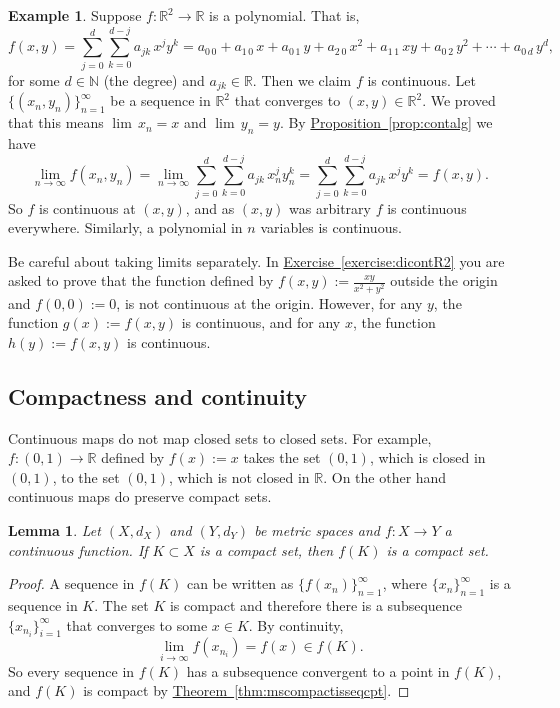 \documentclass[12pt]{book}
\newcommand{\R}{{\mathbb{R}}}
\newcommand{\N}{{\mathbb{N}}}
\theoremstyle{plain}
\newtheorem{lemma}[thm]{Lemma}
\theoremstyle{remark}
\theoremstyle{definition}
\theoremstyle{exercise}
\theoremstyle{example}
\newtheorem{example}[thm]{Example}
\newcommand{\exerciseref}[1]{\hyperref[#1]{Exercise~\ref*{#1}}}
\newcommand{\thmref}[1]{\hyperref[#1]{Theorem~\ref*{#1}}}
\newcommand{\propref}[1]{\hyperref[#1]{Proposition~\ref*{#1}}}
\begin{document}
\begin{example}
Suppose $f \colon \R^2 \to \R$ is a polynomial.  That is,
\begin{equation*}
f(x,y) =
\sum_{j=0}^d
\sum_{k=0}^{d-j}
a_{jk}\,x^jy^k =
a_{0\,0} + a_{1\,0} \, x +
a_{0\,1} \, y+  
a_{2\,0} \, x^2+  
a_{1\,1} \, xy+  
a_{0\,2} \, y^2+ \cdots +
a_{0\,d} \, y^d ,
\end{equation*}
for some $d \in \N$ (the degree) and $a_{jk} \in \R$.  Then we claim 
$f$ is continuous.  Let $\{ (x_n,y_n) \}_{n=1}^\infty$ be a sequence
in $\R^2$ that converges to $(x,y) \in \R^2$.  We proved that this
means $\lim\, x_n = x$ and $\lim\, y_n = y$.
By \propref{prop:contalg} we have
\begin{equation*}
\lim_{n\to\infty}
f(x_n,y_n) =
\lim_{n\to\infty}
\sum_{j=0}^d
\sum_{k=0}^{d-j}
a_{jk} \, x_n^jy_n^k 
=
\sum_{j=0}^d
\sum_{k=0}^{d-j}
a_{jk} \, x^jy^k
=
f(x,y) .
\end{equation*}
So $f$ is continuous at $(x,y)$, and as $(x,y)$ was arbitrary $f$ is
continuous everywhere.  Similarly, a
polynomial in $n$ variables is continuous.
\end{example}

Be careful about taking limits separately.  In \exerciseref{exercise:dicontR2}
you are asked to prove that the function defined by $f(x,y) := \frac{xy}{x^2+y^2}$
outside the origin and $f(0,0) := 0$, is not continuous at the origin.
However, for any $y$, the function $g(x) := f(x,y)$ is
continuous,
and for any $x$, the function $h(y) := f(x,y)$ is continuous.

\subsection{Compactness and continuity}

Continuous maps do not map closed sets to closed sets.  For example,
$f \colon (0,1) \to \R$ defined by $f(x) := x$ takes the set $(0,1)$, which
is closed in $(0,1)$, to the set $(0,1)$, which is not closed in $\R$.
On the other hand continuous maps do preserve compact sets.

\begin{lemma} \label{lemma:continuouscompact}
Let $(X,d_X)$ and $(Y,d_Y)$ be metric spaces
and $f \colon X \to Y$ a continuous function.  If
$K \subset X$ is a compact set, then $f(K)$ is a compact set.
\end{lemma}

\begin{proof}
A sequence in $f(K)$ can be written as
$\{ f(x_n) \}_{n=1}^\infty$, where
$\{ x_n \}_{n=1}^\infty$ is a sequence in $K$.  The set $K$ is compact and
therefore there is a subsequence
$\{ x_{n_i} \}_{i=1}^\infty$ that converges to some $x \in K$.
By continuity,
\begin{equation*}
\lim_{i\to\infty} f(x_{n_i}) = f(x) \in f(K) .
\end{equation*}
So every sequence in $f(K)$ has a subsequence convergent to 
a point in $f(K)$, and $f(K)$ is compact by \thmref{thm:mscompactisseqcpt}.
\end{proof}
\end{document}
